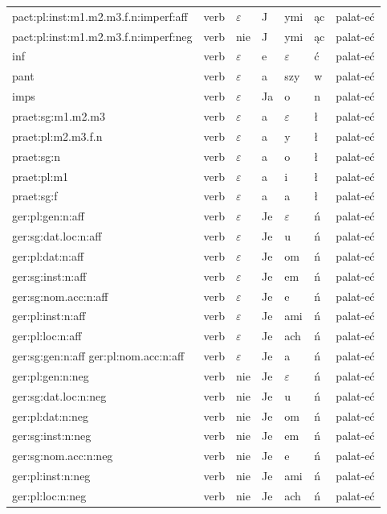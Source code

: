 \documentclass{article}
\begin{document}
\begin{longtable}{p{7cm}|l|l|l|l|l|l}
pact:pl:inst:m1.m2.m3.f.n:imperf:aff & verb & $\varepsilon$ & J & ymi & ąc & palat-eć\\
pact:pl:inst:m1.m2.m3.f.n:imperf:neg & verb & nie & J & ymi & ąc & palat-eć\\
inf & verb & $\varepsilon$ & e & $\varepsilon$ & ć & palat-eć\\
pant & verb & $\varepsilon$ & a & szy & w & palat-eć\\
imps & verb & $\varepsilon$ & Ja & o & n & palat-eć\\
praet:sg:m1.m2.m3 & verb & $\varepsilon$ & a & $\varepsilon$ & ł & palat-eć\\
praet:pl:m2.m3.f.n & verb & $\varepsilon$ & a & y & ł & palat-eć\\
praet:sg:n & verb & $\varepsilon$ & a & o & ł & palat-eć\\
praet:pl:m1 & verb & $\varepsilon$ & a & i & ł & palat-eć\\
praet:sg:f & verb & $\varepsilon$ & a & a & ł & palat-eć\\
ger:pl:gen:n:aff & verb & $\varepsilon$ & Je & $\varepsilon$ & ń & palat-eć\\
ger:sg:dat.loc:n:aff & verb & $\varepsilon$ & Je & u & ń & palat-eć\\
ger:pl:dat:n:aff & verb & $\varepsilon$ & Je & om & ń & palat-eć\\
ger:sg:inst:n:aff & verb & $\varepsilon$ & Je & em & ń & palat-eć\\
ger:sg:nom.acc:n:aff & verb & $\varepsilon$ & Je & e & ń & palat-eć\\
ger:pl:inst:n:aff & verb & $\varepsilon$ & Je & ami & ń & palat-eć\\
ger:pl:loc:n:aff & verb & $\varepsilon$ & Je & ach & ń & palat-eć\\
ger:sg:gen:n:aff ger:pl:nom.acc:n:aff & verb & $\varepsilon$ & Je & a & ń & palat-eć\\
ger:pl:gen:n:neg & verb & nie & Je & $\varepsilon$ & ń & palat-eć\\
ger:sg:dat.loc:n:neg & verb & nie & Je & u & ń & palat-eć\\
ger:pl:dat:n:neg & verb & nie & Je & om & ń & palat-eć\\
ger:sg:inst:n:neg & verb & nie & Je & em & ń & palat-eć\\
ger:sg:nom.acc:n:neg & verb & nie & Je & e & ń & palat-eć\\
ger:pl:inst:n:neg & verb & nie & Je & ami & ń & palat-eć\\
ger:pl:loc:n:neg & verb & nie & Je & ach & ń & palat-eć\\

\end{longtable}
\end{document}
